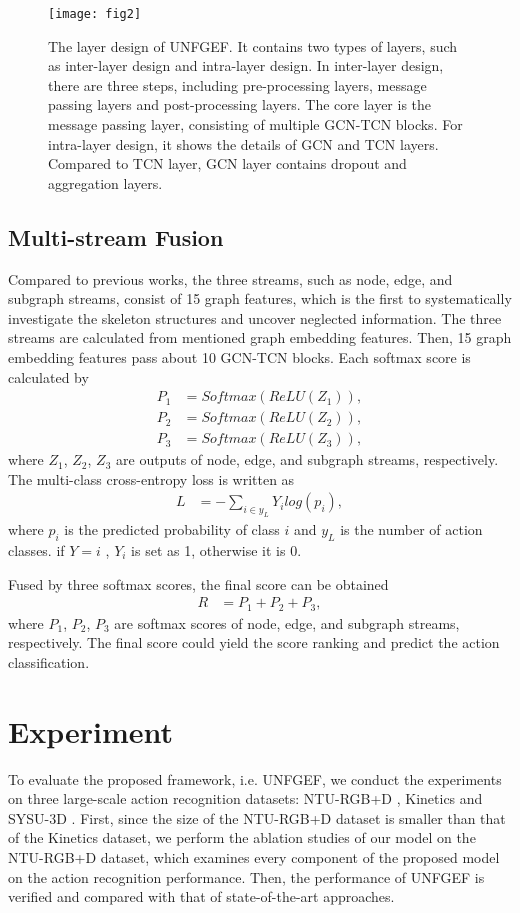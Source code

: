\documentclass[journal]{IEEEtran}
\begin{document}
\begin{figure*}
\centering
\texttt{[image: fig2]}
\caption{The layer design of UNFGEF. It contains two types of layers, such as inter-layer design and intra-layer design. In inter-layer design, there are three steps, including pre-processing layers, message passing layers and post-processing layers. The core layer is the message passing layer, consisting of multiple GCN-TCN blocks. For intra-layer design, it shows the details of GCN and TCN layers. Compared to TCN layer, GCN layer contains dropout and aggregation layers. }
\label{fig2}
\end{figure*}

\subsection{Multi-stream Fusion}

Compared to previous works, the three streams, such as node, edge, and subgraph streams, consist of 15 graph features, which is the first to systematically investigate the skeleton structures and uncover neglected information. The three streams are calculated from mentioned graph embedding features. Then, 15 graph embedding features pass about 10 GCN-TCN blocks. Each softmax score is calculated by
\begin{align}
 P_1 &=Softmax \left (ReLU(Z_1)\right), \\
 P_2 &=Softmax \left (ReLU(Z_2)\right), \\
 P_3 &=Softmax \left (ReLU(Z_3)\right),
 \label{eq25}
\end{align}
where $Z_1$, $Z_2$, $Z_3$ are outputs of node, edge, and subgraph streams, respectively. The multi-class cross-entropy loss is written as
\begin{align}
 L &=-\sum_{i \in y_L} Y_ilog(p_i),
 \label{eq26}
\end{align}
where $p_i$ is the predicted probability of class $i$ and $y_L$ is the number of action classes. if $Y = i$ , $Y_i$ is set as 1, otherwise it is 0.

Fused by three softmax scores, the final score can be obtained
\begin{align}
 R &=P_1+P_2+P_3,
 \label{eq27}
\end{align}
where $P_1$, $P_2$, $P_3$ are softmax scores of node, edge, and subgraph streams, respectively. The final score could yield the score ranking and predict the action classification.

\section{Experiment}
To evaluate the proposed framework, i.e. UNFGEF, we conduct the experiments on three large-scale action recognition datasets: NTU-RGB+D \cite{Shahroudy_2016_NTURGBD}, Kinetics \cite{kay2017kinetics} and SYSU-3D \cite{hu2015jointly}. First, since the size of the NTU-RGB+D dataset is smaller than that of the Kinetics dataset, we perform the ablation studies of our model on the NTU-RGB+D dataset, which examines every component of the proposed model on the action recognition performance. Then, the performance of UNFGEF is verified and compared with that of state-of-the-art approaches.
\end{document}
